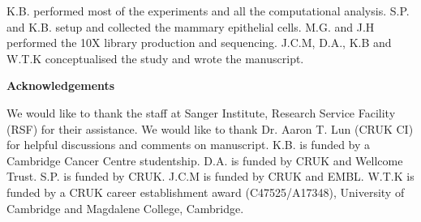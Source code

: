 \documentclass[titlepage, 12pt, oneside]{amsart}
\begin{document}
K.B. performed most of the experiments and all the computational analysis.
S.P. and K.B. setup and collected the mammary epithelial cells.
M.G. and J.H performed the 10X library production and sequencing.
J.C.M, D.A., K.B and W.T.K conceptualised the study and wrote the manuscript.

\textbf{Acknowledgements }

We would like to thank the staff at Sanger Institute, Research Service Facility (RSF) for their assistance.
We would like to thank Dr. Aaron T. Lun (CRUK CI) for helpful discussions and comments on manuscript.
K.B. is funded by a Cambridge Cancer Centre studentship.
D.A. is funded by CRUK and Wellcome Trust.
S.P. is funded by CRUK.
J.C.M is funded by CRUK and EMBL.
W.T.K is funded by a CRUK career establishment award (C47525/A17348), University of Cambridge and Magdalene College, Cambridge.

\printbibliography
\end{document}
